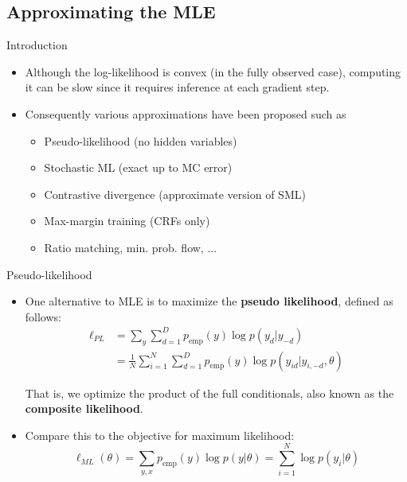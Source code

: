 \documentclass[10pt,mathserif]{beamer}
\begin{document}
\subsection{Approximating the MLE}
\begin{frame}{Introduction}
\begin{itemize}
    \item Although the log-likelihood is convex (in the fully observed case), computing it can be slow since it requires inference at each gradient step.
    \item Consequently various approximations have been proposed such as
    \begin{itemize}
        \item Pseudo-likelihood (no hidden variables)
        \item Stochastic ML (exact up to MC error)
        \item Contrastive divergence (approximate version of SML)
        \item Max-margin training (CRFs only)
        \item Ratio matching, min. prob. flow, ...
    \end{itemize}
\end{itemize}
\end{frame}

\begin{frame}{Pseudo-likelihood}
\begin{itemize}
    \item One alternative to MLE is to maximize the \textbf{pseudo likelihood}, defined as follows:
    \begin{equation}
        \begin{split}
            \ell_{PL} & = \sum_y \sum_{d=1}^D p_{\text{emp}}(y)\log p(y_d|y_{-d})\\
            & = \frac{1}{N} \sum_{i=1}^N \sum_{d=1}^D p_{\text{emp}}(y)\log p(y_{id}|y_{i,-d},\theta)
        \end{split}
    \end{equation}
    
    That is, we optimize the product of the full conditionals, also known as the \textbf{composite likelihood}.

    \item Compare this to the objective for maximum likelihood:
    \begin{equation}
        \ell_{ML}(\theta) = \sum_{y,x} p_{\text{emp}}(y) \log p(y|\theta) = \sum_{i=1}^N \log p(y_i|\theta)
    \end{equation}
\end{itemize}
\end{frame}
\end{document}
